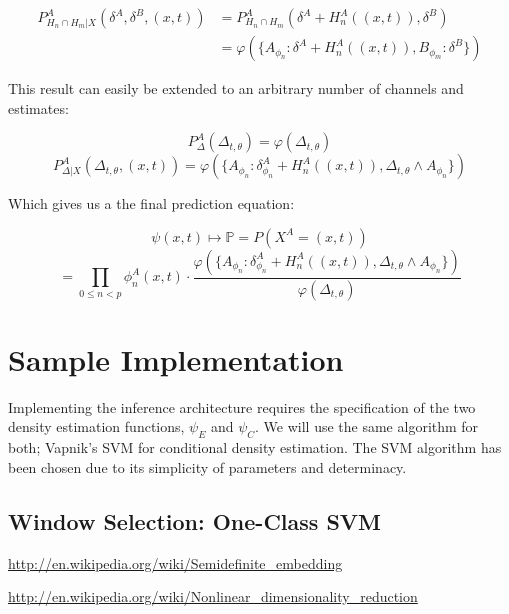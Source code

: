 \documentclass[10pt]{article}
\begin{document}
\begin{align}
P_{H_n \cap H_m | X}^A \left( \delta^A, \delta^B, (x,t) \right) &= P_{H_n \cap H_m}^A \left( \delta^A + H_n^A((x,t)), \delta^B \right) \nonumber \\
&= \varphi \left( \{ A_{\phi_n}:\delta^A + H_n^A((x,t)), B_{\phi_m}: \delta^B \} \right)
\end{align}

This result can easily be extended to an arbitrary number of channels and estimates:

\begin{equation} P_\Delta^A \left( \Delta_{t,\theta} \right) = \varphi \left( \Delta_{t,\theta} \right) \end{equation}
\begin{equation} P_{\Delta|X}^A \left( \Delta_{t,\theta}, (x,t) \right) = \varphi \left( \{ A_{\phi_n} : \delta_{\phi_n}^A + H_n^A((x,t)), \Delta_{t,\theta} \land A_{\phi_n} \} \right) \end{equation}

Which gives us a the final prediction equation:

\[ \psi(x,t) \mapsto \mathbb{P} = P(X^A = (x,t) ) \]
\begin{equation} 
= \prod_{0 \le n < p} \phi_n^A( x, t) \cdot \frac{ \varphi \left( \{ A_{\phi_n} : \delta_{\phi_n}^A + H_n^A((x,t)), \Delta_{t,\theta} \land A_{\phi_n} \} \right) }{ \varphi( \Delta_{t,\theta} ) }
\end{equation}

\section{Sample Implementation}
Implementing the inference architecture requires the specification of the two density estimation functions, \( \psi_E \) and \( \psi_C \).  We will use the same algorithm for both; Vapnik's SVM for conditional density estimation.  The SVM algorithm has been chosen due to its simplicity of parameters and determinacy. 

 
\subsection{Window Selection: One-Class SVM}
\url{http://en.wikipedia.org/wiki/Semidefinite_embedding}

\url{http://en.wikipedia.org/wiki/Nonlinear_dimensionality_reduction}
\end{document}
